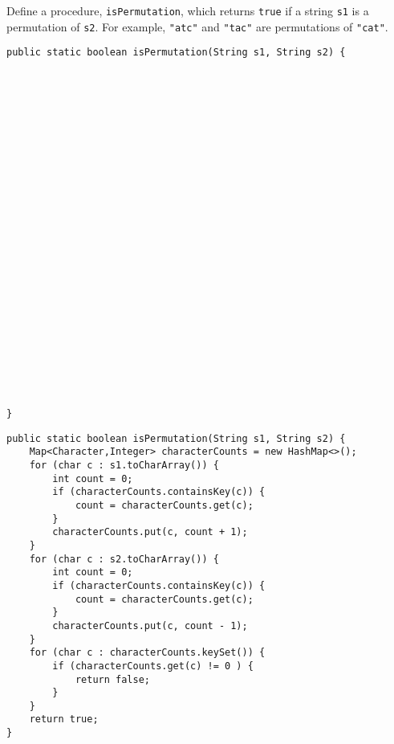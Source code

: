 \question Define a procedure, \texttt{isPermutation}, which returns \texttt{true} if a string \texttt{s1} is a permutation of \texttt{s2}. For example, \texttt{"atc"} and \texttt{"tac"} are permutations of \texttt{"cat"}.

\ifprintanswers\else
\begin{lstlisting}
public static boolean isPermutation(String s1, String s2) {


























}
\end{lstlisting}
\fi

\begin{solution}
\begin{lstlisting}
public static boolean isPermutation(String s1, String s2) {
    Map<Character,Integer> characterCounts = new HashMap<>();
    for (char c : s1.toCharArray()) {
        int count = 0;
        if (characterCounts.containsKey(c)) {
            count = characterCounts.get(c);
        }
        characterCounts.put(c, count + 1);
    }
    for (char c : s2.toCharArray()) {
        int count = 0;
        if (characterCounts.containsKey(c)) {
            count = characterCounts.get(c);
        }
        characterCounts.put(c, count - 1);
    }
    for (char c : characterCounts.keySet()) {
        if (characterCounts.get(c) != 0 ) {
            return false;
        }
    }
    return true;
}
\end{lstlisting}
\end{solution}
